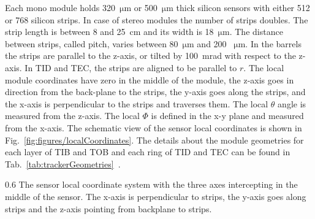 Each mono module holds 320~$\mathrm{\mu m}$ or 500~$\mathrm{\mu m}$ thick silicon sensors with either 512 or 768 silicon strips. In case of stereo modules the number of strips doubles. The strip length is between 8 and 25~cm and its width is 18~$\mathrm{\mu m}$. The distance between strips, called pitch, varies between 80~$\mathrm{\mu m}$ and 200 ~$\mathrm{\mu m}$. In the barrels the strips are parallel to the z-axis, or tilted by 100~mrad with respect to the z-axis. In TID and TEC, the strips are aligned to be parallel to $r$. The local module coordinates have zero in the middle of the module, the z-axis goes in direction from the back-plane to the strips, the y-axis goes along the strips, and the x-axis is perpendicular to the strips and traverses them. The local $\theta$ angle is measured from the z-axis. The local $\Phi$ is defined in the x-y plane and measured from the x-axis. The schematic view of the sensor local coordinates is shown in Fig.~\ref{fig:figures/localCoordinates}. The details about the module geometries for each layer of TIB and TOB and each ring of TID and TEC can be found in Tab.~\ref{tab:trackerGeometries}~\cite{website:hephyPage}.


                 {0.6}       %
                 { The sensor local coordinate system with the three axes intercepting in the middle of the sensor. The x-axis is perpendicular to strips, the y-axis goes along strips and the z-axis pointing from backplane to strips. }

